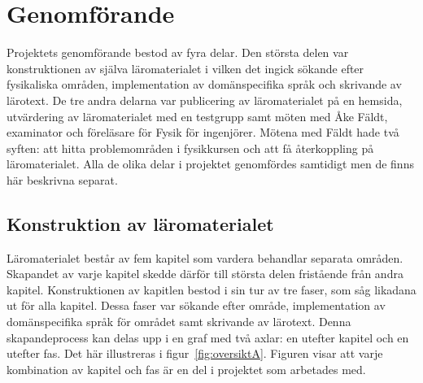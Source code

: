 



\chapter{Genomförande}

Projektets genomförande bestod av fyra delar. Den största delen var
konstruktionen av själva läromaterialet i vilken det ingick sökande efter fysikaliska
områden, implementation av domänspecifika språk och skrivande av lärotext. De
tre andra delarna var publicering av läromaterialet på en hemsida, utvärdering
av läromaterialet med en testgrupp samt möten med Åke Fäldt, examinator och
föreläsare för Fysik för ingenjörer. Mötena med Fäldt hade två syften: att hitta
problemområden i fysikkursen och att få återkoppling på läromaterialet. Alla de olika delar i projektet genomfördes samtidigt men de finns här beskrivna separat.

\section{Konstruktion av läromaterialet}\label{sec:konstruktion}

Läromaterialet består av fem kapitel som vardera behandlar separata
områden. Skapandet av varje kapitel skedde därför till största delen fristående
från andra kapitel. Konstruktionen av kapitlen bestod i sin tur av tre faser,
som såg likadana ut för alla kapitel. Dessa faser var sökande efter område,
implementation av domänspecifika språk för området samt skrivande av lärotext. Denna skapandeprocess kan delas upp i en graf med två axlar: en utefter kapitel
och en utefter fas. Det här illustreras i figur~\ref{fig:oversiktA}. Figuren
visar att varje kombination av kapitel och fas är en del i projektet som
arbetades med.

